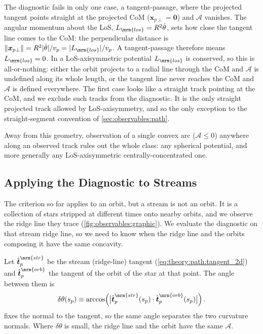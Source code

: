 \documentclass[linenumbers,twocolumn]{aastex701}
\renewcommand{\mbf}[1]{\boldsymbol{#1}}
\newcommand{\xvec}{\mbf{x}}  %
\newcommand{\that}{\hat{\mbf{t}}}  %
\newcommand{\sarc}{s}  %
\newcommand{\speed}{v}  %
\newcommand{\proj}[1]{{#1}_{p}}  %
\newcommand{\projperp}[1]{{#1}_{p \perp}}  %
\newcommand{\tphat}{\proj{\that}}  %
\newcommand{\xskyperp}{\projperp{\xvec}}
\newcommand{\ssky}{\proj{\sarc}} %
\newcommand{\speedsky}{\proj{\speed}}
\begin{document}
        The diagnostic fails in only one case, a {tangent-passage}, where the projected tangent points straight at the projected \gls{CoM} ($\xskyperp = \mbf{0}$) and $\mathcal{A}$ vanishes. %
        The angular momentum about the \gls{LoS}, $L_{\mrm{los}} = R^2\dot{\theta}$, sets how close the tangent line comes to the \gls{CoM}: the perpendicular distance is $\|\xskyperp\| = R^2|\dot{\theta}|/\speedsky = |L_{\mrm{los}}|/\speedsky$. %
        A tangent-passage therefore means $L_{\mrm{los}} = 0$. %
        In a \gls{LoS}-axisymmetric potential $L_{\mrm{los}}$ is conserved, so this is all-or-nothing: either the orbit projects to a radial line through the \gls{CoM} and $\mathcal{A}$ is undefined along its whole length, or the tangent line never reaches the \gls{CoM} and $\mathcal{A}$ is defined everywhere. %
        The first case looks like a straight track pointing at the \gls{CoM}, and we exclude such tracks from the diagnostic. %
        It is the only straight projected track allowed by \gls{LoS}-axisymmetry, and so the only exception to the straight-segment convention of \autoref{sec:observables:path}. %

        Away from this geometry, observation of a single convex arc ($\mathcal{A} \leq 0$) anywhere along an observed track rules out the whole class: any spherical potential, and more generally any \gls{LoS}-axisymmetric centrally-concentrated one. %


    \subsection{Applying the Diagnostic to Streams}\label{sec:streams:match_orbit}

        The criterion so far applies to an orbit, but a stream is not an orbit. %
        It is a collection of stars stripped at different times onto nearby orbits, and we observe the ridge line they trace (\autoref{fig:observables:graphic}). %
        We evaluate the diagnostic on that stream ridge line, so we need to know when the ridge line and the orbits composing it have the same concavity. %

        Let $\tphat^{\mrm{str}}$ be the stream (ridge-line) tangent (\cref{eq:theory:path:tangent_2d}) and $\tphat^{\mrm{orb}}$ the tangent of the orbit of the star at that point. %
        The angle between them is %
        \begin{equation}\label{eq:streams:match_orbit:tangent_mismatch_angle}
            \delta\theta(\ssky)
            \equiv
            \arccos\!\left(\bigl|\tphat^{\mrm{str}}(\ssky)\cdot\tphat^{\mrm{orb}}(\ssky)\bigr|\right). %
        \end{equation}
         fixes the normal to the tangent, so the same angle separates the two curvature normals. %
        Where $\delta\theta$ is small, the ridge line and the orbit have the same $\mathcal{A}$. %
\end{document}
